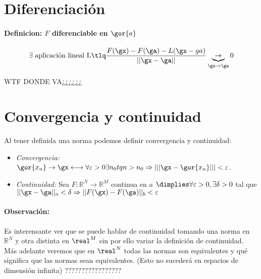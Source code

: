 \documentclass[a4paper,10pt]{apuntes}
\newcommand{\definition}[1]{\paragraph{Definicion: #1\\}}
\begin{document}
\section{Diferenciación}
\definition{$F$ diferenciable en $\gor{a}$}
$$\exists \text{ aplicación lineal L} \tlq \frac{F(\gx)-F(\ga)-L(\gx-ga)}{||\gx-\ga||} \underbrace{\rightarrow}_{\gx\rightarrow\ga} 0$$

\newpage
WTF DONDE VA¿¿¿¿¿¿
\section{Convergencia y continuidad}
Al tener definida una norma podemos definir convergencia y continuidad:
\begin{itemize}
 \item\emph{Convergencia:} $\gor{x_n} \rightarrow \gx \longleftrightarrow \forall \varepsilon > 0 \exists n_0 tq n>n_0 \Rightarrow |||\gx-\gor{x_n}|||<\varepsilon$.
 \item\emph{Continuidad:} Sea $F: \mathbb{R}^N \rightarrow \mathbb{R}^M$ continua en $a$ $\dimplies \forall \varepsilon > 0 , \exists \delta > 0$ tal que $||\gx-\ga||_a < \delta \Rightarrow ||F(\gx)-F(\ga)||_b< \varepsilon$
\end{itemize}
\paragraph{Observación:} Es interensante ver que se puede hablar de continuidad tomando una norma en $\mathbb{R}^N$ y otra distinta en $\real^M$ sin por ello variar la definición de continuidad. Más adelante veremos que en $\real^N$ todas las normas son equivalentes y qué significa que las normas sean equivalentes. (Esto no sucederá en espacios de dimensión infinita)
?????????????????
\end{document}
